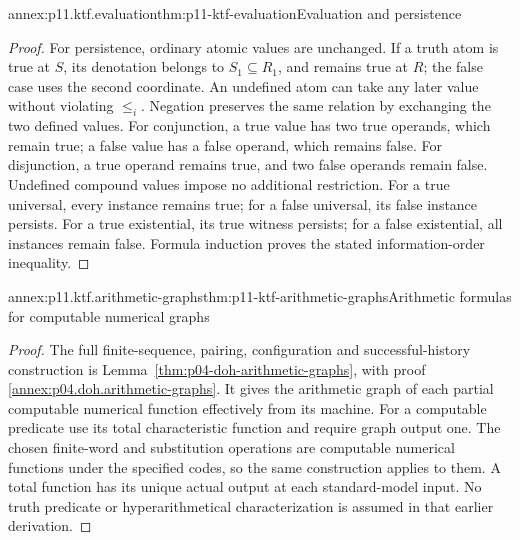 \begin{annexitem}{annex:p11.ktf.evaluation}{thm:p11-ktf-evaluation}{Evaluation and persistence}
\begin{proof}
For persistence, ordinary atomic values are unchanged. If a truth atom
is true at \(S\), its denotation belongs to \(S_1\subseteq R_1\),
and remains true at \(R\); the false case uses the second coordinate.
An undefined atom can take any later value without violating
\(\leq_i\). Negation preserves the same relation by exchanging
the two defined values. For conjunction, a true value has two true operands,
which remain true; a false value has a false operand, which remains false.
For disjunction, a true operand remains true, and two false operands remain
false. Undefined compound values impose no additional restriction.
For a true universal, every instance remains true; for a false universal,
its false instance persists. For a true existential, its true witness
persists; for a false existential, all instances remain false. Formula
induction proves the stated information-order inequality.
\end{proof}
\end{annexitem}

\begin{annexitem}{annex:p11.ktf.arithmetic-graphs}{thm:p11-ktf-arithmetic-graphs}{Arithmetic formulas for computable numerical graphs}
\begin{proof}
The full finite-sequence, pairing, configuration and successful-history
construction is Lemma~\ref{thm:p04-doh-arithmetic-graphs}, with proof
\ref{annex:p04.doh.arithmetic-graphs}. It gives the arithmetic graph of
each partial computable numerical function effectively from its machine.
For a computable predicate use its total characteristic function and
require graph output one. The chosen finite-word and substitution
operations are computable numerical functions under the specified codes,
so the same construction applies to them. A total function has its unique
actual output at each standard-model input. No truth predicate or
hyperarithmetical characterization is assumed in that earlier derivation.
\end{proof}
\end{annexitem}

